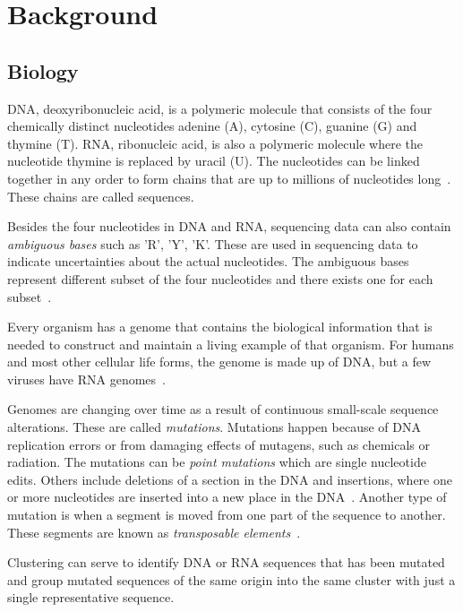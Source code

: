 \section{Background}

\subsection{Biology}
\label{sec:biology}

DNA, deoxyribonucleic acid, is a polymeric molecule that consists of the four
chemically distinct nucleotides adenine (A), cytosine (C), guanine (G) and
thymine (T). RNA, ribonucleic acid, is also a polymeric molecule where the
nucleotide thymine is replaced by uracil (U). The nucleotides can be linked
together in any order to form chains that are up to millions of nucleotides
long~\cite[pp.~8--9]{brown}. These chains are called sequences.

Besides the four nucleotides in DNA and RNA, sequencing data can also contain
\emph{ambiguous bases} such as 'R', 'Y', 'K'. These are used in sequencing
data to indicate uncertainties about the actual nucleotides. The ambiguous bases
represent different subset of the four nucleotides and there exists one for
each subset~\cite{tao}.

Every organism has a genome that contains the biological information that is
needed to construct and maintain a living example of that organism. For humans
and most other cellular life forms, the genome is made up of DNA, but a few
viruses have RNA genomes~\cite[pp.~3--4]{brown}.

Genomes are changing over time as a result of continuous small-scale sequence
alterations. These are called \textit{mutations}. Mutations happen because of
DNA replication errors or from damaging effects of mutagens, such as chemicals
or radiation. The mutations can be \textit{point mutations} which are single
nucleotide edits. Others include deletions of a section in the DNA and
insertions, where one or more nucleotides are inserted into a new place in the
DNA~\cite[pp.~505--506]{brown}. Another type of mutation is when a segment is
moved from one part of the sequence to another. These segments are known as
\emph{transposable elements}~\cite{munoz}.

Clustering can serve to identify DNA or RNA sequences that has been mutated and
group mutated sequences of the same origin into the same cluster with just a
single representative sequence.